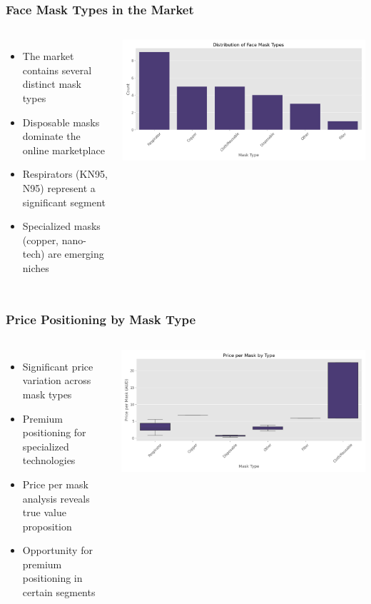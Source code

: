 \documentclass[aspectratio=169]{beamer}
\begin{document}
\begin{frame}
\frametitle{Face Mask Types in the Market}
\begin{columns}
\begin{itemize}
    \item The market contains several distinct mask types
    \item Disposable masks dominate the online marketplace
    \item Respirators (KN95, N95) represent a significant segment
    \item Specialized masks (copper, nano-tech) are emerging niches
\end{itemize}
\includegraphics[width=\textwidth]{plots/mask_type_distribution.png}
\end{columns}
\end{frame}

\begin{frame}
\frametitle{Price Positioning by Mask Type}
\begin{columns}
\begin{itemize}
    \item Significant price variation across mask types
    \item Premium positioning for specialized technologies
    \item Price per mask analysis reveals true value proposition
    \item Opportunity for premium positioning in certain segments
\end{itemize}
\includegraphics[width=\textwidth]{plots/price_by_mask_type.png}
\end{columns}
\end{frame}
\end{document}

